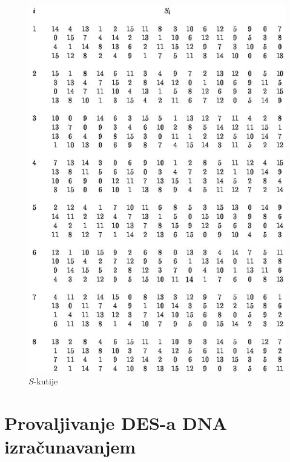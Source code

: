 \documentclass[a4paper,oneside,12pt]{memoir} %
\begin{document}
\begin{spacing}{1.5}
\begin{figure}[h]
\centering \includegraphics[scale=0.7]{S-box.jpg}
\caption{$S$-kutije}
\label{fig:sbox}
\end{figure}
 \newpage
\section{Provaljivanje DES-a DNA izračunavanjem}
\label{sec:DESbreak}

\end{spacing}
\end{document}

